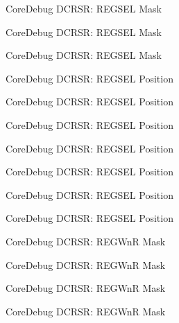 \begin{DoxyRefList}
\label{deprecated__deprecated000330}%
%
Core\+Debug D\+C\+R\+SR\+: R\+E\+G\+S\+EL Mask 

\label{deprecated__deprecated000406}%
%
Core\+Debug D\+C\+R\+SR\+: R\+E\+G\+S\+EL Mask 

\label{deprecated__deprecated000495}%
%
Core\+Debug D\+C\+R\+SR\+: R\+E\+G\+S\+EL Mask  
\item[Member \mbox{\hyperlink{group__CMSIS__CoreDebug_ga52182c8a9f63a52470244c0bc2064f7b}{Core\+Debug\+\_\+\+D\+C\+R\+S\+R\+\_\+\+R\+E\+G\+S\+E\+L\+\_\+\+Pos}} ]\label{deprecated__deprecated000043}%
%
Core\+Debug D\+C\+R\+SR\+: R\+E\+G\+S\+EL Position 

\label{deprecated__deprecated000131}%
%
Core\+Debug D\+C\+R\+SR\+: R\+E\+G\+S\+EL Position 

\label{deprecated__deprecated000187}%
%
Core\+Debug D\+C\+R\+SR\+: R\+E\+G\+S\+EL Position 

\label{deprecated__deprecated000270}%
%
Core\+Debug D\+C\+R\+SR\+: R\+E\+G\+S\+EL Position 

\label{deprecated__deprecated000329}%
%
Core\+Debug D\+C\+R\+SR\+: R\+E\+G\+S\+EL Position 

\label{deprecated__deprecated000405}%
%
Core\+Debug D\+C\+R\+SR\+: R\+E\+G\+S\+EL Position 

\label{deprecated__deprecated000494}%
%
Core\+Debug D\+C\+R\+SR\+: R\+E\+G\+S\+EL Position  
\item[Member \mbox{\hyperlink{group__CMSIS__CoreDebug_ga1eef4992d8f84bc6c0dffed1c87f90a5}{Core\+Debug\+\_\+\+D\+C\+R\+S\+R\+\_\+\+R\+E\+G\+Wn\+R\+\_\+\+Msk}} ]\label{deprecated__deprecated000042}%
%
Core\+Debug D\+C\+R\+SR\+: R\+E\+G\+WnR Mask 

\label{deprecated__deprecated000130}%
%
Core\+Debug D\+C\+R\+SR\+: R\+E\+G\+WnR Mask 

\label{deprecated__deprecated000186}%
%
Core\+Debug D\+C\+R\+SR\+: R\+E\+G\+WnR Mask 

\label{deprecated__deprecated000269}%
%
Core\+Debug D\+C\+R\+SR\+: R\+E\+G\+WnR Mask 


\end{DoxyRefList}
